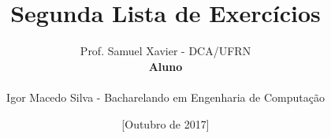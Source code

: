 
\title{Segunda Lista de Exercícios}

\author{
Prof. Samuel Xavier - DCA/UFRN\\

\textbf{Aluno}\\
\\
Igor Macedo Silva - Bacharelando em Engenharia de Computação \\
}

\date{[Outubro de 2017]}

\makeatletter
\def\@maketitle{
\begin{center}
   \texttt{[image: cover/imgs/ufrn.png]}\\
   \vfill
   {\large Universidade Federal do Rio Grande do Norte\\
   Departamento de Engenharia de Computacão e Automação}

   \vskip 4em
   {\Large Programação Concorrente e Distribuida}

   \vskip 4.5em
   {\normalsize\printwp}

   \vskip 5em
   {\LARGE\bfseries\@title}

   \vfill
   {\normalsize Natal-RN, Brasil\\\@date}
\end{center}

\newpage
{\noindent\Large\bfseries Professor}\smallskip\\
{\normalsize\@author}
}
\makeatother




\frenchspacing
\maketitle
\thispagestyle{empty}

\newpage
\tableofcontents
\thispagestyle{empty}

\newpage
\listoffigures
\thispagestyle{empty}

\newpage
\listoftables
\thispagestyle{empty}

